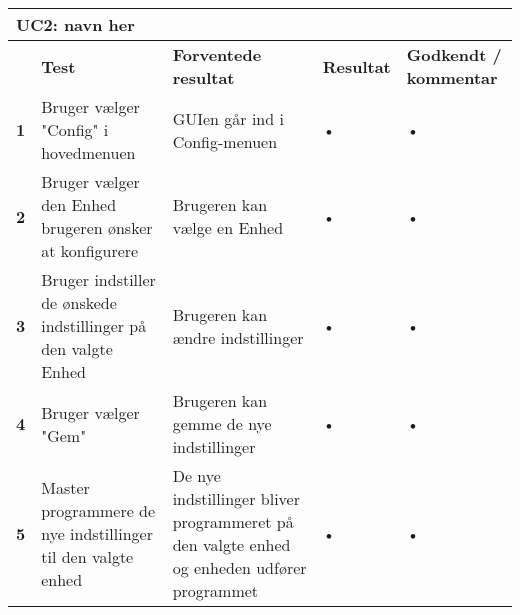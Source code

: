 
\begin{longtable}{|p{5mm}|p{40mm}|p{40mm}|p{20mm}|p{25mm}|}
\hline 
\multicolumn{5}{|l|}{\textbf{UC2: navn her}} \\ 
\hline 
& \textbf{Test} & \textbf{Forventede resultat} & \textbf{Resultat} & \textbf{Godkendt / kommentar} \\ 
\hline 
\textbf{1}& Bruger vælger "Config" i hovedmenuen & GUIen går ind i Config-menuen & • & • \\ 
\hline 
\textbf{2}& Bruger vælger den Enhed brugeren ønsker at konfigurere & Brugeren kan vælge en Enhed & • & • \\ 
\hline 
\textbf{3}& Bruger indstiller de ønskede indstillinger på den valgte Enhed & Brugeren kan ændre indstillinger & • & • \\ 
\hline 
\textbf{4}& Bruger vælger "Gem" & Brugeren kan gemme de nye indstillinger & • & • \\ 
\hline 
\textbf{5}& Master programmere de nye indstillinger til den valgte enhed & De nye indstillinger bliver programmeret på den valgte enhed og enheden udfører programmet & • & • \\ 
\hline 
\end{longtable}
